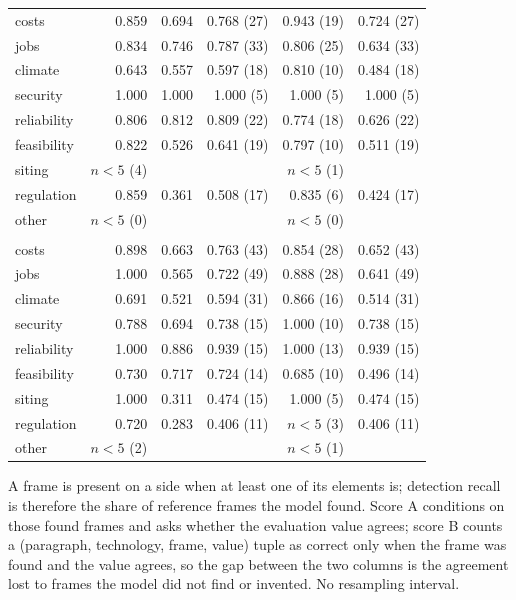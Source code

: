 \begin{table}[htbp]
\begin{threeparttable}
\begin{tabular}{@{}lrrrrr@{}}
costs & 0.859 & 0.694 & 0.768 (27) & 0.943 (19) & 0.724 (27) \\
jobs & 0.834 & 0.746 & 0.787 (33) & 0.806 (25) & 0.634 (33) \\
climate & 0.643 & 0.557 & 0.597 (18) & 0.810 (10) & 0.484 (18) \\
security & 1.000 & 1.000 & 1.000 (5) & 1.000 (5) & 1.000 (5) \\
reliability & 0.806 & 0.812 & 0.809 (22) & 0.774 (18) & 0.626 (22) \\
feasibility & 0.822 & 0.526 & 0.641 (19) & 0.797 (10) & 0.511 (19) \\
siting & $n<5$ (4) & & & $n<5$ (1) & \\
regulation & 0.859 & 0.361 & 0.508 (17) & 0.835 (6) & 0.424 (17) \\
other & $n<5$ (0) & & & $n<5$ (0) & \\
\addlinespace
\multicolumn{6}{@{}l}{\emph{English}} \\
costs & 0.898 & 0.663 & 0.763 (43) & 0.854 (28) & 0.652 (43) \\
jobs & 1.000 & 0.565 & 0.722 (49) & 0.888 (28) & 0.641 (49) \\
climate & 0.691 & 0.521 & 0.594 (31) & 0.866 (16) & 0.514 (31) \\
security & 0.788 & 0.694 & 0.738 (15) & 1.000 (10) & 0.738 (15) \\
reliability & 1.000 & 0.886 & 0.939 (15) & 1.000 (13) & 0.939 (15) \\
feasibility & 0.730 & 0.717 & 0.724 (14) & 0.685 (10) & 0.496 (14) \\
siting & 1.000 & 0.311 & 0.474 (15) & 1.000 (5) & 0.474 (15) \\
regulation & 0.720 & 0.283 & 0.406 (11) & $n<5$ (3) & 0.406 (11) \\
other & $n<5$ (2) & & & $n<5$ (1) & \\
\bottomrule
\end{tabular}
\begin{tablenotes}\footnotesize
\item A frame is present on a side when at least one of its elements is; detection recall is therefore the share of reference frames the model found. Score A conditions on those found frames and asks whether the evaluation value agrees; score B counts a (paragraph, technology, frame, value) tuple as correct only when the frame was found and the value agrees, so the gap between the two columns is the agreement lost to frames the model did not find or invented. No resampling interval.
\end{tablenotes}
\end{threeparttable}
\end{table}
